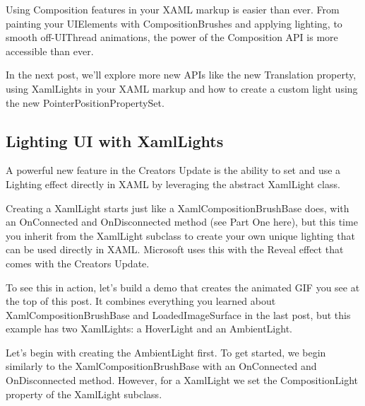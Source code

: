 Using Composition features in your XAML markup is easier than ever. From painting your UIElements with CompositionBrushes and applying lighting, to smooth off-UIThread animations, the power of the Composition API is more accessible than ever.

In the next post, we’ll explore more new APIs like the new Translation property, using XamlLights in your XAML markup and how to create a custom light using the new PointerPositionPropertySet.


\subsection{Lighting UI with XamlLights}
A powerful new feature in the Creators Update is the ability to set and use a Lighting effect directly in XAML by leveraging the abstract XamlLight class.

Creating a XamlLight starts just like a XamlCompositionBrushBase does, with an OnConnected and OnDisconnected method (see Part One here), but this time you inherit from the XamlLight subclass to create your own unique lighting that can be used directly in XAML. Microsoft uses this with the Reveal effect that comes with the Creators Update.

To see this in action, let’s build a demo that creates the animated GIF you see at the top of this post. It combines everything you learned about XamlCompositionBrushBase and LoadedImageSurface in the last post, but this example has two XamlLights: a HoverLight and an AmbientLight.

Let’s begin with creating the AmbientLight first. To get started, we begin similarly to the XamlCompositionBrushBase with an OnConnected and OnDisconnected method. However, for a XamlLight we set the CompositionLight property of the XamlLight subclass.


